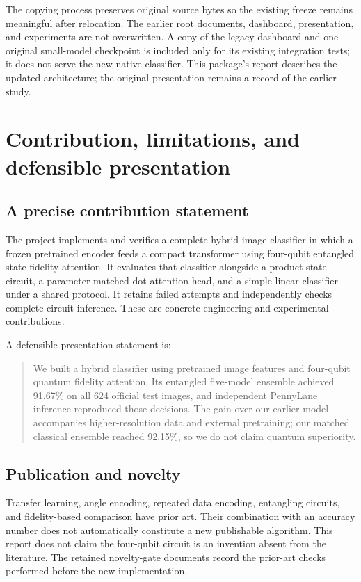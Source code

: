 \documentclass[11pt,a4paper]{report}
\begin{document}
The copying process preserves original source bytes so the existing freeze remains meaningful after relocation. The earlier root documents, dashboard, presentation, and experiments are not overwritten. A copy of the legacy dashboard and one original small-model checkpoint is included only for its existing integration tests; it does not serve the new native classifier. This package's report describes the updated architecture; the original presentation remains a record of the earlier study.

\chapter{Contribution, limitations, and defensible presentation}
\section{A precise contribution statement}
The project implements and verifies a complete hybrid image classifier in which a frozen pretrained encoder feeds a compact transformer using four-qubit entangled state-fidelity attention. It evaluates that classifier alongside a product-state circuit, a parameter-matched dot-attention head, and a simple linear classifier under a shared protocol. It retains failed attempts and independently checks complete circuit inference. These are concrete engineering and experimental contributions.

A defensible presentation statement is:
\begin{quote}
We built a hybrid classifier using pretrained image features and four-qubit quantum fidelity attention. Its entangled five-model ensemble achieved 91.67\% on all 624 official test images, and independent PennyLane inference reproduced those decisions. The gain over our earlier model accompanies higher-resolution data and external pretraining; our matched classical ensemble reached 92.15\%, so we do not claim quantum superiority.
\end{quote}

\section{Publication and novelty}
Transfer learning, angle encoding, repeated data encoding, entangling circuits, and fidelity-based comparison have prior art. Their combination with an accuracy number does not automatically constitute a new publishable algorithm. This report does not claim the four-qubit circuit is an invention absent from the literature. The retained novelty-gate documents record the prior-art checks performed before the new implementation.
\end{document}
